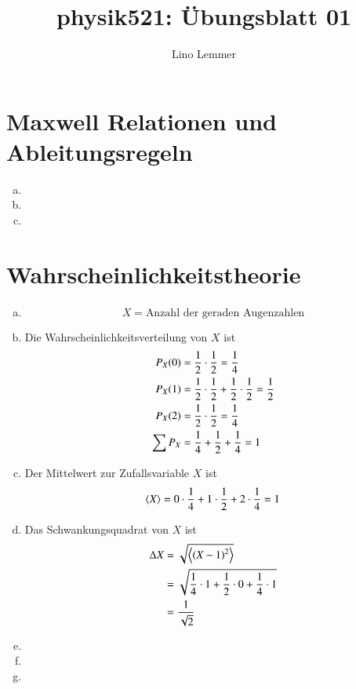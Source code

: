 

\setcounter{section}{1}
\renewcommand\thesection{H\,1.\arabic{section}}

\title{physik521: Übungsblatt 01}
\author{Lino Lemmer}


\maketitle
\section{Maxwell Relationen und Ableitungsregeln}

\begin{enumerate}[(a)]
    \item
    \item
    \item
\end{enumerate}

\section{Wahrscheinlichkeitstheorie}

\begin{enumerate}[(a)]
    \item
        \[
            X = \text{Anzahl der geraden Augenzahlen}
        \]
    \item
        Die Wahrscheinlichkeitsverteilung von $X$ ist
        \begin{align*}
            P_X(0) &= \frac 12\cdot\frac 12 = \frac 14\\
            P_X(1) &= \frac 12\cdot\frac 12 + \frac 12\cdot\frac 12 = \frac 12\\
            P_X(2) &= \frac 12\cdot\frac 12 = \frac 14\\
            \sum P_X &= \frac 14 + \frac 12 + \frac 14 = 1
        \end{align*}
    \item
        Der Mittelwert zur Zufallsvariable $X$ ist
        \[
            \left\langle X\right\rangle = 0\cdot\frac14 + 1\cdot\frac 12 + 2\cdot\frac14 = 1
        \]
    \item
        Das Schwankungsquadrat von $X$ ist
        \begin{align*}
            \Delta X &= \sqrt{\mw{\del{X - 1}^2}}\\
                       &= \sqrt{\frac 14 \cdot 1 + \half \cdot 0 + \frac 14 \cdot 1}\\
                       &= \frac1{\sqrt{2}}
        \end{align*}
    \item
    \item
    \item
\end{enumerate}

